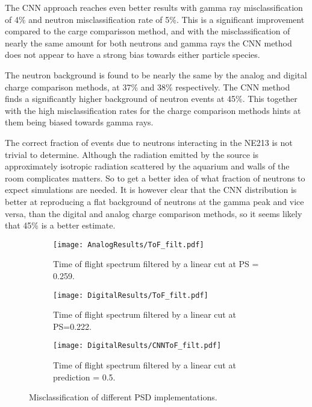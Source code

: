 \documentclass[main.tex]{subfiles}
\begin{document}
The CNN approach reaches even better results with gamma ray misclassification of 4\% and neutron misclassification rate of 5\%.
This is a significant improvement compared to the carge comparisson method, and with the misclassification of nearly the same amount for both neutrons and gamma rays the CNN method does not appear to have a strong bias towards either particle species.

The neutron background is found to be nearly the same by the analog and digital charge comparison methods, at 37\% and 38\% respectively. The CNN method finds a significantly higher background of neutron events at 45\%. This together with the high misclassification rates for the charge comparison methods hints at them being biased towards gamma rays.

The correct fraction of events due to neutrons interacting in the NE213 is not trivial to determine. Although the radiation emitted by the source is approximately isotropic radiation scattered by the aquarium and walls of the room complicates matters. So to get a better idea of what fraction of neutrons to expect simulations are needed. It is however clear that the CNN distribution is better at reproducing a flat background of neutrons at the gamma peak and vice versa, than the digital and analog charge comparison methods, so it seems likely that 45\% is a better estimate.



\begin{figure}
    \centering
    \begin{subfigure}[bh]{\textwidth}
   	   	\centering
	    \texttt{[image: AnalogResults/ToF\_filt.pdf]}
        \label{fig:ToF_filt_A}
    	\caption{Time of flight spectrum filtered by a linear cut at PS = 0.259.}
    	\label{fig:ToF_filt_A}
   	\end{subfigure}
    \begin{subfigure}[bh]{\textwidth}
   	    \centering
        \texttt{[image: DigitalResults/ToF\_filt.pdf]}
        \caption{Time of flight spectrum filtered by a linear cut at PS=0.222.}
        \label{fig:ToF_filt_D}
    \end{subfigure}
	\begin{subfigure}[bh]{\textwidth}
	    \centering
        \texttt{[image: DigitalResults/CNNToF\_filt.pdf]}
        \caption{Time of flight spectrum filtered by a linear cut at prediction = 0.5.}
        \label{fig:ToF_filt_D_CNN}
    \end{subfigure}
	
	\caption[Misclassification of different PSD implementations.]{Misclassification of different PSD implementations.}
    \label{fig:tof_cc_cnn}
\end{figure}
\end{document}
